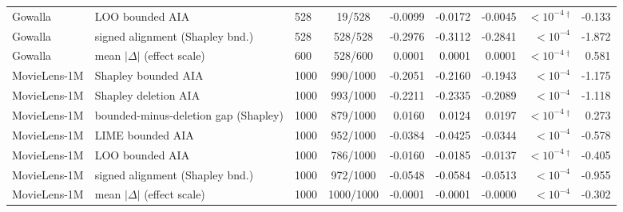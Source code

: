 \begin{table}[!htbp]
\begin{tabular}{@{}lllcrrrrr@{}}
Gowalla & LOO bounded AIA & 528 & 19/528 & -0.0099 & -0.0172 & -0.0045 & $<10^{-4}$\,$^{\dagger}$ & -0.133 \\
Gowalla & signed alignment (Shapley bnd.) & 528 & 528/528 & -0.2976 & -0.3112 & -0.2841 & $<10^{-4}$ & -1.872 \\
Gowalla & mean $|\Delta|$ (effect scale) & 600 & 528/600 & 0.0001 & 0.0001 & 0.0001 & $<10^{-4}$\,$^{\dagger}$ & 0.581 \\
MovieLens-1M & Shapley bounded AIA & 1000 & 990/1000 & -0.2051 & -0.2160 & -0.1943 & $<10^{-4}$ & -1.175 \\
MovieLens-1M & Shapley deletion AIA & 1000 & 993/1000 & -0.2211 & -0.2335 & -0.2089 & $<10^{-4}$ & -1.118 \\
MovieLens-1M & bounded-minus-deletion gap (Shapley) & 1000 & 879/1000 & 0.0160 & 0.0124 & 0.0197 & $<10^{-4}$\,$^{\dagger}$ & 0.273 \\
MovieLens-1M & LIME bounded AIA & 1000 & 952/1000 & -0.0384 & -0.0425 & -0.0344 & $<10^{-4}$ & -0.578 \\
MovieLens-1M & LOO bounded AIA & 1000 & 786/1000 & -0.0160 & -0.0185 & -0.0137 & $<10^{-4}$\,$^{\dagger}$ & -0.405 \\
MovieLens-1M & signed alignment (Shapley bnd.) & 1000 & 972/1000 & -0.0548 & -0.0584 & -0.0513 & $<10^{-4}$ & -0.955 \\
MovieLens-1M & mean $|\Delta|$ (effect scale) & 1000 & 1000/1000 & -0.0001 & -0.0001 & -0.0000 & $<10^{-4}$ & -0.302 \\
\bottomrule
\end{tabular}
\end{table}


